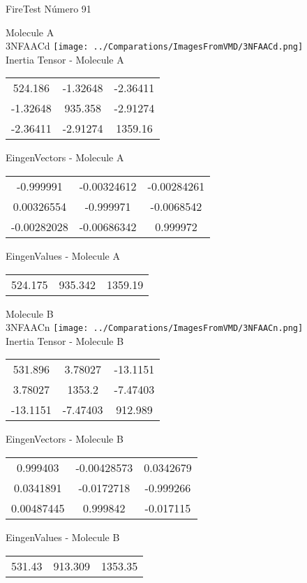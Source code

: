 \vtab[-2cm]
\begin{center}
{\large FireTest \tab Número 91}
\end{center}
\begin{multicols}{2}
\begin{center}

Molecule A \\ 
3NFAACd
\texttt{[image: ../Comparations/ImagesFromVMD/3NFAACd.png]}
\\
Inertia Tensor - Molecule A \\
\vtab

\begin{tabular}{|c c c|}
524.186	 & 	-1.32648	 & 	-2.36411	 \\
-1.32648	 & 	935.358	 & 	-2.91274	 \\
-2.36411	 & 	-2.91274	 & 	1359.16
\end{tabular}

\vtab
 EingenVectors - Molecule A     \\
\vtab
\begin{tabular}{|c c c|}
-0.999991	 & 	-0.00324612	 & 	-0.00284261	 \\
0.00326554	 & 	-0.999971	 & 	-0.0068542	 \\
-0.00282028	 & 	-0.00686342	 & 	0.999972
\end{tabular}

\vtab
 EingenValues - Molecule A     \\
\vtab
\begin{tabular}{|c c c|}
524.175	 & 	935.342	 & 	1359.19	 \\
\end{tabular}
\columnbreak

Molecule B \\ 
3NFAACn
\texttt{[image: ../Comparations/ImagesFromVMD/3NFAACn.png]}
\\
Inertia Tensor - Molecule B \\
\vtab

\begin{tabular}{|c c c|}
531.896	 & 	3.78027	 & 	-13.1151	 \\
3.78027	 & 	1353.2	 & 	-7.47403	 \\
-13.1151	 & 	-7.47403	 & 	912.989
\end{tabular}

\vtab
 EingenVectors - Molecule B     \\
\vtab
\begin{tabular}{|c c c|}
0.999403	 & 	-0.00428573	 & 	0.0342679	 \\
0.0341891	 & 	-0.0172718	 & 	-0.999266	 \\
0.00487445	 & 	0.999842	 & 	-0.017115
\end{tabular}

\vtab
 EingenValues - Molecule B     \\
\vtab
\begin{tabular}{|c c c|}
531.43	 & 	913.309	 & 	1353.35	 \\
\end{tabular}

\end{center}
\end{multicols}
